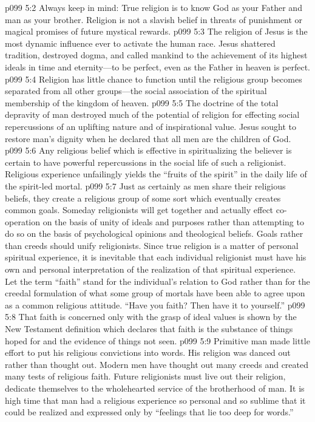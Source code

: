 \vs p099 5:2 Always keep in mind: True religion is to know God as your Father and man as your brother. Religion is not a slavish belief in threats of punishment or magical promises of future mystical rewards.
\pc \vs p099 5:3 The religion of Jesus is the most dynamic influence ever to activate the human race. Jesus shattered tradition, destroyed dogma, and called mankind to the achievement of its highest ideals in time and eternity---to be perfect, even as the Father in heaven is perfect.
\pc \vs p099 5:4 Religion has little chance to function until the religious group becomes separated from all other groups---the social association of the spiritual membership of the kingdom of heaven.
\vs p099 5:5 The doctrine of the total depravity of man destroyed much of the potential of religion for effecting social repercussions of an uplifting nature and of inspirational value. Jesus sought to restore man’s dignity when he declared that all men are the children of God.
\vs p099 5:6 Any religious belief which is effective in spiritualizing the believer is certain to have powerful repercussions in the social life of such a religionist. Religious experience unfailingly yields the “fruits of the spirit” in the daily life of the spirit\hyp{}led mortal.
\vs p099 5:7 Just as certainly as men share their religious beliefs, they create a religious group of some sort which eventually creates common goals. Someday religionists will get together and actually effect co\hyp{}operation on the basis of unity of ideals and purposes rather than attempting to do so on the basis of psychological opinions and theological beliefs. Goals rather than creeds should unify religionists. Since true religion is a matter of personal spiritual experience, it is inevitable that each individual religionist must have his own and personal interpretation of the realization of that spiritual experience. Let the term “faith” stand for the individual’s relation to God rather than for the creedal formulation of what some group of mortals have been able to agree upon as a common religious attitude. “Have you faith? Then have it to yourself.”
\vs p099 5:8 That faith is concerned only with the grasp of ideal values is shown by the New Testament definition which declares that faith is the substance of things hoped for and the evidence of things not seen.
\vs p099 5:9 Primitive man made little effort to put his religious convictions into words. His religion was danced out rather than thought out. Modern men have thought out many creeds and created many tests of religious faith. Future religionists must live out their religion, dedicate themselves to the wholehearted service of the brotherhood of man. It is high time that man had a religious experience so personal and so sublime that it could be realized and expressed only by “feelings that lie too deep for words.”
